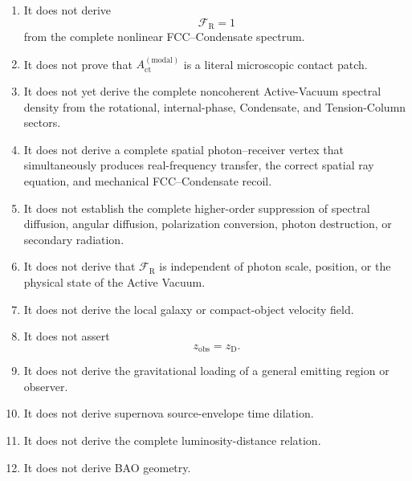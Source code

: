 \begin{enumerate}
    \item It does not derive
    \begin{equation}
        \mathcal F_{\mathrm R}=1
    \end{equation}
    from the complete nonlinear FCC--Condensate spectrum.

    \item It does not prove that
    $A_{\mathrm{ct}}^{(\mathrm{modal})}$
    is a literal microscopic contact patch.

    \item It does not yet derive the complete noncoherent Active-Vacuum
    spectral density from the rotational, internal-phase, Condensate, and
    Tension-Column sectors.

    \item It does not derive a complete spatial photon--receiver vertex that
    simultaneously produces real-frequency transfer, the correct spatial ray
    equation, and mechanical FCC--Condensate recoil.

    \item It does not establish the complete higher-order suppression of
    spectral diffusion, angular diffusion, polarization conversion, photon
    destruction, or secondary radiation.

    \item It does not derive that
    $\mathcal F_{\mathrm R}$ is independent of photon scale, position, or the
    physical state of the Active Vacuum.

    \item It does not derive the local galaxy or compact-object velocity field.

    \item It does not assert
    \begin{equation}
        z_{\mathrm{obs}}
        =
        z_{\mathrm D}.
    \end{equation}

    \item It does not derive the gravitational loading of a general emitting
    region or observer.

    \item It does not derive supernova source-envelope time dilation.

    \item It does not derive the complete luminosity-distance relation.

    \item It does not derive BAO geometry.


\end{enumerate}
